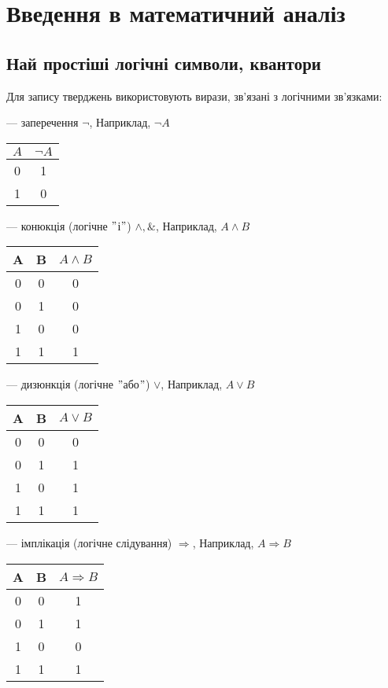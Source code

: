 \chapter{Введення в математичний аналіз}

\section{Най простіші логічні символи, квантори}

Для запису тверджень використовують вирази, зв'язані з логічними зв'язками:

--- заперечення $\neg$, Наприклад, $\neg A$

\begin{tabular}{c|c}
    $A$ & $\neg A$ \\
    \hline
    0 & 1 \\
    1 & 0 \\
\end{tabular}

--- конюкція (логічне $"$і$"$) $\wedge, \&$, Наприклад, $A \wedge B$

\begin{tabular}{c|c|c}
    A & B & $A \wedge B$ \\
    \hline
    0 & 0 & 0 \\
    0 & 1 & 0 \\
    1 & 0 & 0 \\
    1 & 1 & 1 \\
\end{tabular}

--- дизюнкція (логічне $"$або$"$) $\vee$, Наприклад, $A \vee B$

\begin{tabular}{c|c|c}
    A & B & $A \vee B$ \\
    \hline
    0 & 0 & 0 \\
    0 & 1 & 1 \\
    1 & 0 & 1 \\
    1 & 1 & 1 \\
\end{tabular}

--- імплікація (логічне слідування) $\Rightarrow$, Наприклад, $A \Rightarrow B$

\begin{tabular}{c|c|c}
    A & B & $A \Rightarrow B$ \\
    \hline
    0 & 0 & 1 \\
    0 & 1 & 1 \\
    1 & 0 & 0 \\
    1 & 1 & 1 \\
\end{tabular}

